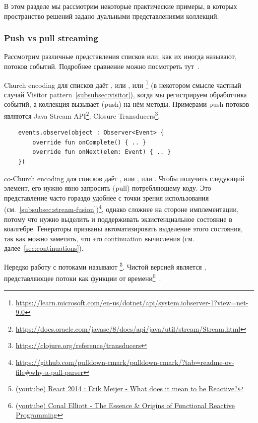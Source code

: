 В этом разделе мы рассмотрим некоторые практические примеры, в которых пространство решений задано дуальными представлениями коллекций.

\subsubsection{Push vs pull streaming} \label{subsubsec:push-pull}

Рассмотрим различные представления списков или, как их иногда называют, потоков событий.
Подробнее сравнение можно посмотреть тут~\cite[параграф 3]{kiselyov2017stream}.

Church encoding для списков даёт , или , или \footnote{\url{https://learn.microsoft.com/en-us/dotnet/api/system.iobserver-1?view=net-9.0}} (в некотором смысле частный случай Visitor pattern~\ref{subsubsec:visitor}), когда мы регистрируем обработчика событий, а коллекция вызывает (push) на нём методы.
Примерами push потоков являются Java Stream API\footnote{\url{https://docs.oracle.com/javase/8/docs/api/java/util/stream/Stream.html}}, Closure Transducers\footnote{\url{https://clojure.org/reference/transducers}}.
\begin{verbatim}
    events.observe(object : Observer<Event> {
        override fun onComplete() { .. }
        override fun onNext(elem: Event) { .. }
    })
\end{verbatim}

co-Church encoding для списков даёт , или , или .
Чтобы получить следующий элемент, его нужно явно запросить (pull) потребляющему коду.
Это представление часто гораздо удобнее с точки зрения использования (см.~\ref{subsubsec:stream-fusion})\footnote{\url{https://github.com/pulldown-cmark/pulldown-cmark/?tab=readme-ov-file\#why-a-pull-parser}}, однако сложнее на стороне имплементации, потому что нужно выделить и поддерживать экзистенциальное состояние в коалгебре.
Генераторы призваны автоматизировать выделение этого состояния, так как можно заметить, что это continuation вычисления (см. далее~\ref{sec:continuations}).

Нередко работу с потоками называют \footnote{\href{https://youtu.be/sTSQlYX5DU0?si=Xhfi62ScXHBBjdBx}{(youtube) React 2014 : Erik Meijer - What does it mean to be Reactive?}}.
Чистой версией является , представляющее потоки как функции от времени\footnote{\href{https://youtu.be/rfmkzp76M4M?si=TRBq8wWbcDOhSbIO}{(youtube) Conal Elliott - The Essence \& Origins of Functional Reactive Programming}}~\cite{elliott1997functional}.

